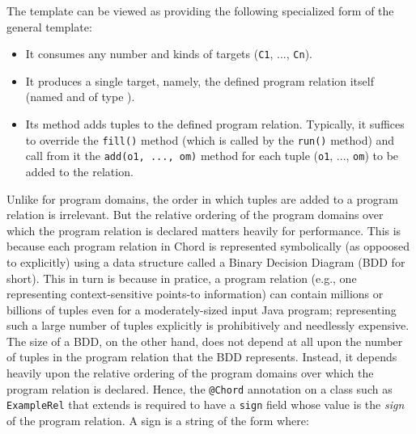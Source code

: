 The  template can be viewed as providing the following
specialized form of the general  template:

\begin{itemize}
\item
It consumes any number and kinds of targets ({\tt C1}, ..., {\tt Cn}).
\item
It produces a single target, namely, the defined program relation itself
(named  and of type ).
\item
Its  method adds tuples to the defined program relation.  Typically,
it suffices to override the {\tt fill()} method (which is called by the
{\tt run()} method) and call from it the {\tt add(o1, ..., om)} method
for each tuple ({\tt o1}, ..., {\tt om}) to be added to the relation.
\end{itemize}

Unlike for program domains, the order in which tuples are added to a program
relation is irrelevant.  But the relative ordering of the program domains over
which the program relation is declared matters heavily for performance.
This is because each program relation in Chord is represented symbolically (as
oppoosed to explicitly) using a data structure called a Binary Decision Diagram
(BDD for short).  This in turn is because in pratice, a program relation (e.g.,
one representing context-sensitive points-to information)
can contain millions or billions of tuples even for a moderately-sized
input Java program; representing such a large number of tuples explicitly is
prohibitively and needlessly expensive.  The size of a BDD, on the other hand,
does not depend at all upon the number of tuples in the program relation that
the BDD represents.  Instead, it depends heavily upon the relative ordering
of the program domains over which the program relation is declared.
Hence, the {\tt @Chord} annotation on a class such as {\tt ExampleRel} that
extends  is required to have a {\tt sign} field whose value is
the {\it sign} of the program relation.
A sign is a string of the form  where:

